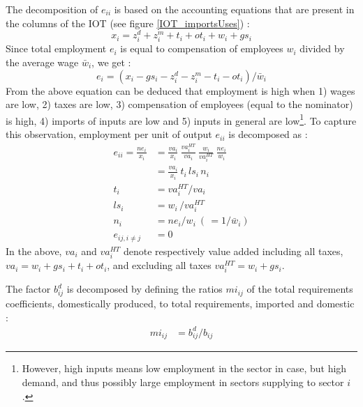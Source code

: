 \documentclass[12pt,english]{article}
\newcommand{\mli}[1]{\mathit{#1}}
\begin{document}
The decomposition of $e_{ii}$ is based on the accounting equations that are present in the columns of the IOT (see figure \ref{IOT_importsUses}) :
\begin{equation}
x_i = z^d_i + z^m_i + t_i + ot_i + w_i + gs_i
\end{equation}
Since total employment $e_i$ is equal to compensation of employees $w_i$ divided by the average wage $\bar{w}_i$, we get :
\begin{equation}
 e_i = (x_i - gs_i - z^d_i - z^m_i - t_i - ot_i )/\bar{w}_i \label{empl_accounting}
\end{equation}
From the above equation can be deduced that employment is high when 1) wages are low, 2) taxes are low, 3) compensation of employees (equal to the nominator) is high, 4) imports of inputs are low and 5) inputs in general are low\footnote{However, high inputs means low employment in the sector in case, but high demand, and thus possibly large employment in sectors supplying to sector $i$.}. To capture this observation, employment per unit of output $e_{ii}$ is decomposed as :
\begin{align}
e_{ii} = \frac{ne_i}{x_i}&= \frac{va_i}{x_i} \ \frac{va^{HT}_i}{va_i}  \ \frac{w_i}{va^{HT}_i}  \ \frac{ne_i}{w_i} \nonumber \\
&= \frac{va_i}{x_i} \ t_i \, ls_i \, n_i \label{ECdecomp_e} \\
t_i &= va^{HT}_i/va_i \nonumber  \\
ls_i &= w_i\, /va^{HT}_i \nonumber \\
n_i &= \mli{ne}_i/w_i \  (\, =1/\bar{w}_i)	  \nonumber \\
e_{ij, i\neq j} &= 0		  \nonumber 
\end{align}
In the above, $va_i$ and $va_i^{HT}$ denote respectively value added including all taxes, $va_i= w_i + gs_i + t_i + ot_i$, and excluding all taxes $va^{HT}_i= w_i + gs_i$.

The factor $b^d_{ij}$ is decomposed by defining the ratios $mi_{ij}$ of the total requirements coefficients, domestically produced, to total requirements, imported and domestic :
\begin{align}
mi_{ij} &= b^d_{ij} / b_{ij} \label{ECdecomp_bd} 
\end{align}
 
\end{document}
